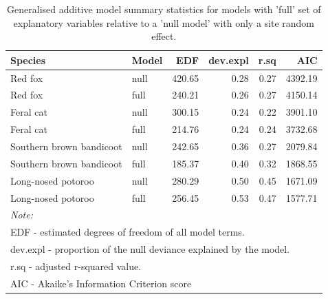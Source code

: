 \documentclass[]{elsarticle} %
\begin{document}
\begin{longtable}[t]{llrrrr}
\caption{\label{tab:occ-model-sumstats}Generalised additive model summary statistics for models with 'full' set of explanatory variables relative to a 'null model' with only a site random effect.}\\
\toprule
Species & Model & EDF & dev.expl & r.sq & AIC\\
\midrule
Red fox & null & 420.65 & 0.28 & 0.27 & 4392.19\\
Red fox & full & 240.21 & 0.26 & 0.27 & 4150.14\\
Feral cat & null & 300.15 & 0.24 & 0.22 & 3901.10\\
Feral cat & full & 214.76 & 0.24 & 0.24 & 3732.68\\
Southern brown bandicoot & null & 242.65 & 0.36 & 0.27 & 2079.84\\
\addlinespace
Southern brown bandicoot & full & 185.37 & 0.40 & 0.32 & 1868.55\\
Long-nosed potoroo & null & 280.29 & 0.50 & 0.45 & 1671.09\\
Long-nosed potoroo & full & 256.45 & 0.53 & 0.47 & 1577.71\\
\bottomrule
\multicolumn{6}{l}{\rule{0pt}{1em}\textit{Note: }}\\
\multicolumn{6}{l}{\rule{0pt}{1em}EDF - estimated degrees of freedom of all model terms.}\\
\multicolumn{6}{l}{\rule{0pt}{1em}dev.expl - proportion of the null deviance explained by the model. }\\
\multicolumn{6}{l}{\rule{0pt}{1em}r.sq -  adjusted r-squared value.}\\
\multicolumn{6}{l}{\rule{0pt}{1em}AIC - Akaike's Information Criterion score}\\
\end{longtable}
\endgroup{}

\newpage
\end{document}
